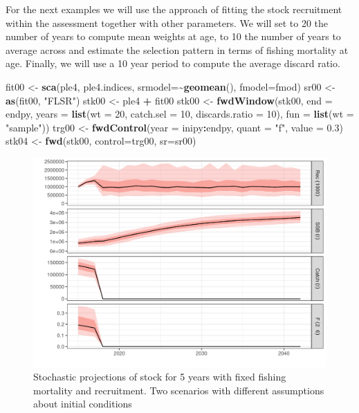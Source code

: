 \documentclass[
]{book}
\newenvironment{Shaded}{\begin{snugshade}}{\end{snugshade}}
\newcommand{\AttributeTok}[1]{\textcolor[rgb]{0.13,0.29,0.53}{#1}}
\newcommand{\DecValTok}[1]{\textcolor[rgb]{0.00,0.00,0.81}{#1}}
\newcommand{\FloatTok}[1]{\textcolor[rgb]{0.00,0.00,0.81}{#1}}
\newcommand{\FunctionTok}[1]{\textcolor[rgb]{0.13,0.29,0.53}{\textbf{#1}}}
\newcommand{\NormalTok}[1]{#1}
\newcommand{\OtherTok}[1]{\textcolor[rgb]{0.56,0.35,0.01}{#1}}
\newcommand{\SpecialCharTok}[1]{\textcolor[rgb]{0.81,0.36,0.00}{\textbf{#1}}}
\newcommand{\StringTok}[1]{\textcolor[rgb]{0.31,0.60,0.02}{#1}}
\begin{document}
For the next examples we will use the approach of fitting the stock recruitment within the assessment together with other parameters. We will set to 20 the number of years to compute mean weights at age, to 10 the number of years to average across and estimate the selection pattern in terms of fishing mortality at age. Finally, we will use a 10 year period to compute the average discard ratio.

\begin{Shaded}
\begin{Highlighting}[]
\NormalTok{fit00 }\OtherTok{\textless{}{-}} \FunctionTok{sca}\NormalTok{(ple4, ple4.indices, }\AttributeTok{srmodel=}\SpecialCharTok{\textasciitilde{}}\FunctionTok{geomean}\NormalTok{(), }\AttributeTok{fmodel=}\NormalTok{fmod)}
\NormalTok{sr00 }\OtherTok{\textless{}{-}} \FunctionTok{as}\NormalTok{(fit00, }\StringTok{"FLSR"}\NormalTok{)}
\NormalTok{stk00 }\OtherTok{\textless{}{-}}\NormalTok{ ple4 }\SpecialCharTok{+}\NormalTok{ fit00}
\NormalTok{stk00 }\OtherTok{\textless{}{-}} \FunctionTok{fwdWindow}\NormalTok{(stk00, }\AttributeTok{end =}\NormalTok{ endpy, }\AttributeTok{years =} \FunctionTok{list}\NormalTok{(}\AttributeTok{wt =} \DecValTok{20}\NormalTok{, }\AttributeTok{catch.sel =} \DecValTok{10}\NormalTok{, }\AttributeTok{discards.ratio =} \DecValTok{10}\NormalTok{), }\AttributeTok{fun =} \FunctionTok{list}\NormalTok{(}\AttributeTok{wt =} \StringTok{"sample"}\NormalTok{))}
\NormalTok{trg00 }\OtherTok{\textless{}{-}} \FunctionTok{fwdControl}\NormalTok{(}\AttributeTok{year =}\NormalTok{ inipy}\SpecialCharTok{:}\NormalTok{endpy, }\AttributeTok{quant =} \StringTok{"f"}\NormalTok{, }\AttributeTok{value =} \FloatTok{0.3}\NormalTok{)}
\NormalTok{stk04 }\OtherTok{\textless{}{-}} \FunctionTok{fwd}\NormalTok{(stk00, }\AttributeTok{control=}\NormalTok{trg00, }\AttributeTok{sr=}\NormalTok{sr00)}
\end{Highlighting}
\end{Shaded}

\begin{figure}
\centering
\includegraphics{_bookdown_files/_main_files/figure-html/unnamed-chunk-122-1.png}
\caption{\label{fig:unnamed-chunk-122}Stochastic projections of stock for 5 years with fixed fishing mortality and recruitment. Two scenarios with different assumptions about initial conditions}
\end{figure}
\end{document}
